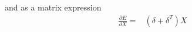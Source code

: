 \documentclass[a4paper]{article}
\begin{document}
and as a matrix expression
\begin{align}
 \frac{\partial{E}}{\partial{X}}  = & (\delta +\delta^T)X
\end{align}

\newpage


    
\end{document}
